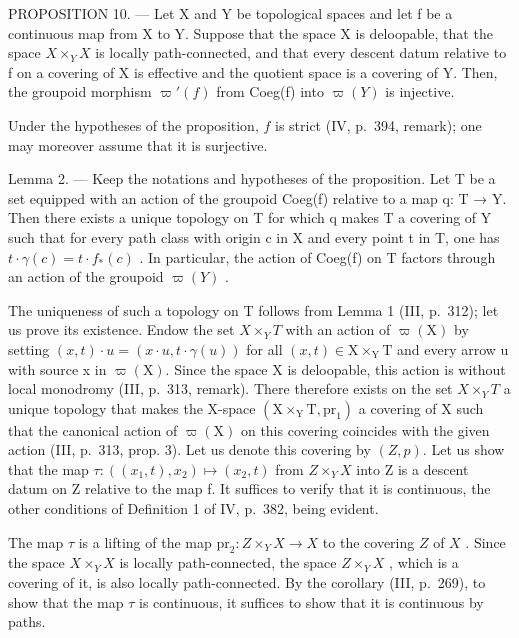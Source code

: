 PROPOSITION 10. --- Let X and Y be topological spaces and let f be a continuous map from X to Y. Suppose that the space X is deloopable, that the space \(X\times_{Y}X\) is locally path-connected, and that every descent datum relative to f on a covering of X is effective and the quotient space is a covering of Y. Then, the groupoid morphism \(\varpi'(f)\) from Coeg(f) into \(\varpi(Y)\) is injective.

Under the hypotheses of the proposition, \(f\) is strict (IV, p.~394, remark); one may moreover assume that it is surjective.

Lemma 2. --- Keep the notations and hypotheses of the proposition. Let T be a set equipped with an action of the groupoid Coeg(f) relative to a map q: T → Y. Then there exists a unique topology on T for which q makes T a covering of Y such that for every path class with origin c in X and every point t in T, one has \(t \cdot \gamma(c) = t \cdot f_{*}(c)\) . In particular, the action of Coeg(f) on T factors through an action of the groupoid \(\varpi(Y)\) .

The uniqueness of such a topology on T follows from Lemma 1 (III, p.~312); let us prove its existence. Endow the set \(X\times_{Y}T\) with an action of \(\varpi(\mathrm{X})\) by setting \((x,t)\cdot u=(x\cdot u,t\cdot\gamma(u))\) for all \((x,t)\in\mathrm{X}\times_{\mathrm{Y}}\mathrm{T}\) and every arrow u with source x in \(\varpi(\mathrm{X})\). Since the space X is deloopable, this action is without local monodromy (III, p.~313, remark). There therefore exists on the set \(X\times_{Y}T\) a unique topology that makes the X-space \((\mathrm{X}\times_{\mathrm{Y}}\mathrm{T},\mathrm{pr}_{1})\) a covering of X such that the canonical action of \(\varpi(\mathrm{X})\) on this covering coincides with the given action (III, p.~313, prop. 3). Let us denote this covering by \((Z,p)\). Let us show that the map \(\tau: ((x_{1},t),x_{2})\mapsto(x_{2},t)\) from \(Z\times_{Y}X\) into Z is a descent datum on Z relative to the map f. It suffices to verify that it is continuous, the other conditions of Definition 1 of IV, p.~382, being evident.

The map \(\tau\) is a lifting of the map \(\mathrm{pr}_2\colon Z\times_Y X\to X\) to the covering \(Z\) of \(X\) . Since the space \(X\times_Y X\) is locally path-connected, the space \(Z\times_Y X\) , which is a covering of it, is also locally path-connected. By the corollary (III, p.~269), to show that the map \(\tau\) is continuous, it suffices to show that it is continuous by paths.

